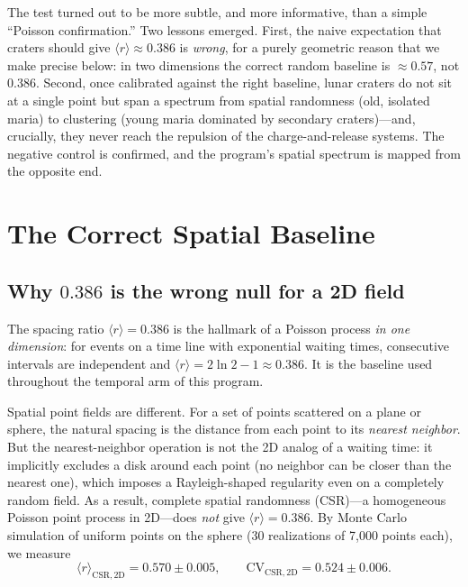 \documentclass[12pt,a4paper]{article}
\begin{document}
The test turned out to be more subtle, and more informative, than a simple ``Poisson confirmation.'' Two lessons emerged. First, the naive expectation that craters should give $\langle r\rangle\approx0.386$ is \emph{wrong}, for a purely geometric reason that we make precise below: in two dimensions the correct random baseline is $\approx0.57$, not $0.386$. Second, once calibrated against the right baseline, lunar craters do not sit at a single point but span a spectrum from spatial randomness (old, isolated maria) to clustering (young maria dominated by secondary craters)---and, crucially, they never reach the repulsion of the charge-and-release systems. The negative control is confirmed, and the program's spatial spectrum is mapped from the opposite end.

\section{The Correct Spatial Baseline}

\subsection{Why $0.386$ is the wrong null for a 2D field}

The spacing ratio $\langle r\rangle=0.386$ is the hallmark of a Poisson process \emph{in one dimension}: for events on a time line with exponential waiting times, consecutive intervals are independent and $\langle r\rangle=2\ln 2 -1\approx0.386$. It is the baseline used throughout the temporal arm of this program.

Spatial point fields are different. For a set of points scattered on a plane or sphere, the natural spacing is the distance from each point to its \emph{nearest neighbor}. But the nearest-neighbor operation is not the 2D analog of a waiting time: it implicitly excludes a disk around each point (no neighbor can be closer than the nearest one), which imposes a Rayleigh-shaped regularity even on a completely random field. As a result, complete spatial randomness (CSR)---a homogeneous Poisson point process in 2D---does \emph{not} give $\langle r\rangle=0.386$. By Monte Carlo simulation of uniform points on the sphere (30 realizations of 7{,}000 points each), we measure
\begin{equation}
\langle r\rangle_{\mathrm{CSR,2D}} = 0.570 \pm 0.005, \qquad \mathrm{CV}_{\mathrm{CSR,2D}} = 0.524 \pm 0.006 .
\end{equation}
\end{document}
